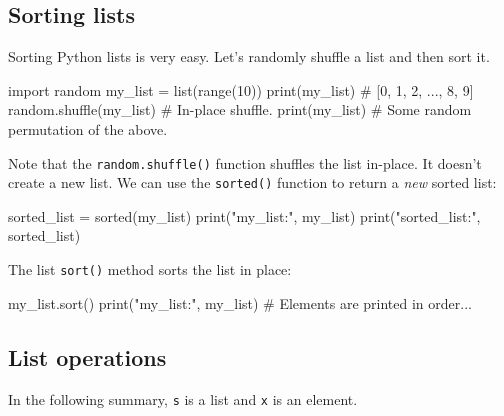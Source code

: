\documentclass[12pt]{article} \newif\ifsolution\solutiontrue %
\begin{document}
\subsection{Sorting lists}\label{sorting-lists}

Sorting Python lists is very easy. Let's randomly shuffle a list and
then sort it.

\begin{python}
import random
my_list = list(range(10))
print(my_list)             # [0, 1, 2, ..., 8, 9]
random.shuffle(my_list)    # In-place shuffle.
print(my_list)             # Some random permutation of the above.
\end{python}

Note that the \texttt{random.shuffle()} function shuffles the list
in-place. It doesn't create a new list.
We can use the \texttt{sorted()} function to return a \emph{new} sorted list:

\begin{python}
sorted_list = sorted(my_list)
print("my_list:", my_list)
print("sorted_list:", sorted_list)
\end{python}

The list \texttt{sort()} method sorts the list in place:

\begin{python}
my_list.sort()
print("my_list:", my_list)  # Elements are printed in order...
\end{python}

\subsection{List operations}\label{list-operations}

In the following summary, \texttt{s} is a list and \texttt{x} is an
element.
\end{document}
